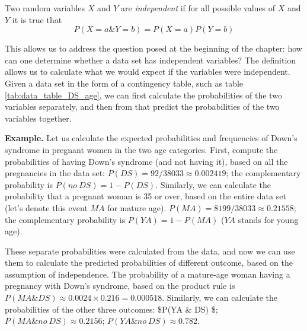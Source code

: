 \documentclass[
  letterpaper,
  DIV=11,
  numbers=noendperiod]{scrreprt}
\begin{document}
\begin{tcolorbox}[enhanced jigsaw, coltitle=black, arc=.35mm, opacitybacktitle=0.6, breakable, bottomtitle=1mm, toptitle=1mm, titlerule=0mm, colback=white, leftrule=.75mm, rightrule=.15mm, colframe=quarto-callout-note-color-frame, colbacktitle=quarto-callout-note-color!10!white, opacityback=0, title=\textcolor{quarto-callout-note-color}{\faInfo}\hspace{0.5em}{Definition}, left=2mm, toprule=.15mm, bottomrule=.15mm]

Two random variables \(X\) and \(Y\) are \emph{independent} if for all
possible values of \(X\) and \(Y\) it is true that
\[ P(X=a \& Y=b) = P(X=a)P(Y=b)\]

\end{tcolorbox}

This allows us to address the question posed at the beginning of the
chapter: how can one determine whether a data set has independent
variables? The definition allows us to calculate what we would expect if
the variables were independent. Given a data set in the form of a
contingency table, such as table \ref{tab:data_table_DS_age}, we can
first calculate the probabilities of the two variables separately, and
then from that predict the probabilities of the two variables together.

\textbf{Example.} Let us calculate the expected probabilities and
frequencies of Down's syndrome in pregnant women in the two age
categories. First, compute the probabilities of having Down's syndrome
(and not having it), based on all the pregnancies in the data set:
\(P(DS) = 92/38033 \approx 0.002419\); the complementary probability is
\(P(no \ DS) = 1 - P(DS)\). Similarly, we can calculate the probability
that a pregnant woman is 35 or over, based on the entire data set (let's
denote this event \(MA\) for mature age).
\(P(MA) = 8199/38033 \approx 0.21558\); the complementary probability is
\(P(YA) = 1 - P(MA)\) (\(YA\) stands for young age).

These separate probabilities were calculated from the data, and now we
can use them to calculate the predicted probabilities of different
outcome, based on the assumption of independence. The probability of a
mature-age woman having a pregnancy with Down's syndrome, based on the
product rule is \(P(MA \& DS) \approx 0.0024 \times 0.216 = 0.000518\).
Similarly, we can calculate the probabilities of the other three
outcomes: \$P(YA \& DS)  \$;
\(P(MA \& no \ DS) \approx 0.2156\); \(P(YA \& no \ DS) \approx 0.782\).
\end{document}
